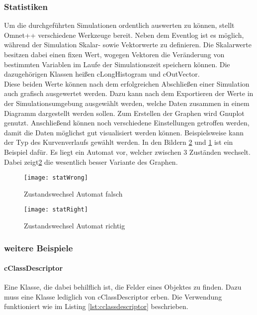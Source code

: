 \subsubsection{Statistiken}

Um die durchgeführten Simulationen ordentlich auswerten zu können, stellt Omnet++ verschiedene Werkzeuge bereit. Neben dem Eventlog ist es möglich, während der Simulation Skalar- sowie Vektorwerte zu definieren. Die Skalarwerte besitzen dabei einen fixen Wert, wogegen Vektoren die Veränderung von bestimmten Variablen im Laufe der Simulationszeit speichern können. Die dazugehörigen Klassen heißen cLongHistogram und cOutVector.\\
Diese beiden Werte können nach dem erfolgreichen Abschließen einer Simulation auch grafisch ausgewertet werden. Dazu kann nach dem Exportieren der Werte in der Simulationsumgebung ausgewählt werden, welche Daten zusammen in einem Diagramm dargestellt werden sollen. Zum Erstellen der Graphen wird Gnuplot\cite{gnuplot} genutzt. Anschließend können noch verschiedene Einstellungen getroffen werden, damit die Daten möglichst gut visualisiert werden können. Beispielsweise kann der Typ des Kurvenverlaufs gewählt werden. In den Bildern \ref{fig:statRight} und \ref{fig:statWrong} ist ein Beispiel dafür. Es liegt ein Automat vor, welcher zwischen 3 Zuständen wechselt. Dabei zeigt\ref{fig:statRight} die wesentlich besser Variante des Graphen.

\begin{figure}[htbp]
\centering
\caption{Zustandswechsel Automat falsch}
\label{fig:statWrong}
\texttt{[image: statWrong]}
\end{figure}

\begin{figure}[htbp]
\centering
\caption{Zustandswechsel Automat richtig}
\label{fig:statRight}
\texttt{[image: statRight]}
\end{figure}

\subsubsection{weitere Beispiele}

\paragraph{cClassDescriptor} Eine Klasse, die dabei behilflich ist, die Felder eines Objektes zu finden. Dazu muss eine Klasse lediglich von cClassDescriptor erben. Die Verwendung funktioniert wie im Listing \ref{lst:cclassdescriptor} beschrieben. 

